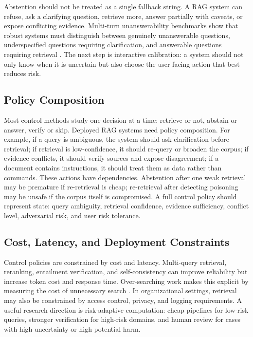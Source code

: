 \documentclass[11pt]{article}
\begin{document}
Abstention should not be treated as a single fallback string. A RAG system can refuse, ask a clarifying question, retrieve more, answer partially with caveats, or expose conflicting evidence. Multi-turn unanswerability benchmarks show that robust systems must distinguish between genuinely unanswerable questions, underspecified questions requiring clarification, and answerable questions requiring retrieval \citep{rrag141}. The next step is interactive calibration: a system should not only know when it is uncertain but also choose the user-facing action that best reduces risk.

\subsection{Policy Composition}

Most control methods study one decision at a time: retrieve or not, abstain or answer, verify or skip. Deployed RAG systems need policy composition. For example, if a query is ambiguous, the system should ask clarification before retrieval; if retrieval is low-confidence, it should re-query or broaden the corpus; if evidence conflicts, it should verify sources and expose disagreement; if a document contains instructions, it should treat them as data rather than commands. These actions have dependencies. Abstention after one weak retrieval may be premature if re-retrieval is cheap; re-retrieval after detecting poisoning may be unsafe if the corpus itself is compromised. A full control policy should represent state: query ambiguity, retrieval confidence, evidence sufficiency, conflict level, adversarial risk, and user risk tolerance.

\subsection{Cost, Latency, and Deployment Constraints}

Control policies are constrained by cost and latency. Multi-query retrieval, reranking, entailment verification, and self-consistency can improve reliability but increase token cost and response time. Over-searching work makes this explicit by measuring the cost of unnecessary search \citep{rrag006}. In organizational settings, retrieval may also be constrained by access control, privacy, and logging requirements. A useful research direction is risk-adaptive computation: cheap pipelines for low-risk queries, stronger verification for high-risk domains, and human review for cases with high uncertainty or high potential harm.
\end{document}
